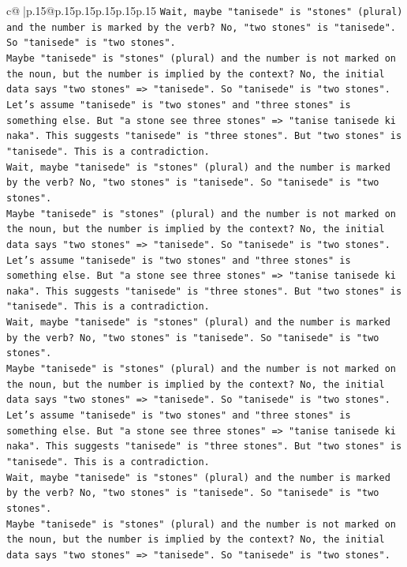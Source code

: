 \documentclass{article}
\begin{document}
{\begin{supertabular}{c@{$\;$}|p{.15\linewidth}@{}p{.15\linewidth}p{.15\linewidth}p{.15\linewidth}p{.15\linewidth}p{.15\linewidth}}
{{{\texttt{Wait, maybe "tanisede" is "stones" (plural) and the number is marked by the verb? No, "two stones" is "tanisede". So "tanisede" is "two stones".} \\
\texttt{Maybe "tanisede" is "stones" (plural) and the number is not marked on the noun, but the number is implied by the context? No, the initial data says "two stones" => "tanisede". So "tanisede" is "two stones".} \\
\texttt{Let's assume "tanisede" is "two stones" and "three stones" is something else. But "a stone see three stones" => "tanise tanisede ki naka". This suggests "tanisede" is "three stones". But "two stones" is "tanisede". This is a contradiction.} \\
\texttt{Wait, maybe "tanisede" is "stones" (plural) and the number is marked by the verb? No, "two stones" is "tanisede". So "tanisede" is "two stones".} \\
\texttt{Maybe "tanisede" is "stones" (plural) and the number is not marked on the noun, but the number is implied by the context? No, the initial data says "two stones" => "tanisede". So "tanisede" is "two stones".} \\
\texttt{Let's assume "tanisede" is "two stones" and "three stones" is something else. But "a stone see three stones" => "tanise tanisede ki naka". This suggests "tanisede" is "three stones". But "two stones" is "tanisede". This is a contradiction.} \\
\texttt{Wait, maybe "tanisede" is "stones" (plural) and the number is marked by the verb? No, "two stones" is "tanisede". So "tanisede" is "two stones".} \\
\texttt{Maybe "tanisede" is "stones" (plural) and the number is not marked on the noun, but the number is implied by the context? No, the initial data says "two stones" => "tanisede". So "tanisede" is "two stones".} \\
\texttt{Let's assume "tanisede" is "two stones" and "three stones" is something else. But "a stone see three stones" => "tanise tanisede ki naka". This suggests "tanisede" is "three stones". But "two stones" is "tanisede". This is a contradiction.} \\
\texttt{Wait, maybe "tanisede" is "stones" (plural) and the number is marked by the verb? No, "two stones" is "tanisede". So "tanisede" is "two stones".} \\
\texttt{Maybe "tanisede" is "stones" (plural) and the number is not marked on the noun, but the number is implied by the context? No, the initial data says "two stones" => "tanisede". So "tanisede" is "two stones".} \\
}}}
\end{supertabular}}
\end{document}
